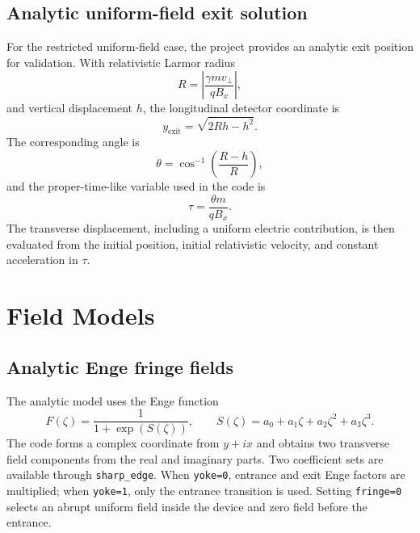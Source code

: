 \documentclass[11pt,a4paper]{report}
\newcommand{\code}[1]{\texttt{#1}}
\begin{document}
\section{Analytic uniform-field exit solution}
For the restricted uniform-field case, the project provides an analytic exit
position for validation.  With relativistic Larmor radius
\begin{equation}
  R=\left|\frac{\gamma m v_\perp}{qB_x}\right|,
\end{equation}
and vertical displacement $h$, the longitudinal detector coordinate is
\begin{equation}
  y_{\mathrm{exit}}=\sqrt{2Rh-h^2}.
\end{equation}
The corresponding angle is
\begin{equation}
  \theta=\cos^{-1}\left(\frac{R-h}{R}\right),
\end{equation}
and the proper-time-like variable used in the code is
\begin{equation}
  \tau=\frac{\theta m}{qB_x}.
\end{equation}
The transverse displacement, including a uniform electric contribution, is
then evaluated from the initial position, initial relativistic velocity, and
constant acceleration in $\tau$.

\chapter{Field Models}

\section{Analytic Enge fringe fields}
The analytic model uses the Enge function
\begin{equation}
  F(\zeta)=\frac{1}{1+\exp(S(\zeta))},\qquad
  S(\zeta)=a_0+a_1\zeta+a_2\zeta^2+a_3\zeta^3.
\end{equation}
The code forms a complex coordinate from $y+ix$ and obtains two transverse
field components from the real and imaginary parts.  Two coefficient sets are
available through \code{sharp\_edge}.  When \code{yoke=0}, entrance and exit
Enge factors are multiplied; when \code{yoke=1}, only the entrance transition
is used.  Setting \code{fringe=0} selects an abrupt uniform field inside the
device and zero field before the entrance.
\end{document}
